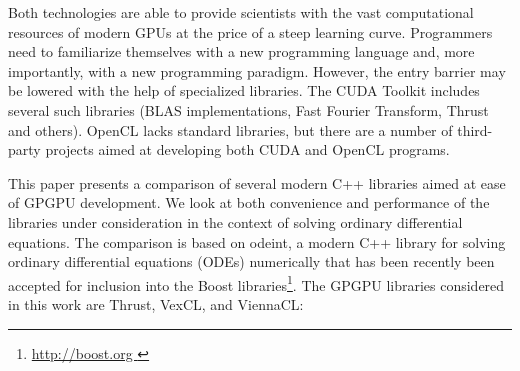 \documentclass[final]{siamltex}
\begin{document}
Both technologies are able to provide scientists with the vast computational
resources of modern GPUs at the price of a steep learning curve.
Programmers need to familiarize
themselves with a new programming language and, more importantly, with a
new programming paradigm. However, the entry barrier may be lowered with the help of
specialized libraries. The CUDA Toolkit includes several such libraries (BLAS
implementations, Fast Fourier Transform, Thrust and others). OpenCL lacks
standard libraries, but there are a number of third-party projects aimed at
developing both CUDA and OpenCL programs.

This paper presents a comparison of several modern C++ libraries aimed
at ease of GPGPU development. We look at both convenience and
performance of the libraries under consideration in the context of
solving ordinary differential equations.  The comparison is based on
odeint, a modern C++ library for solving ordinary differential equations (ODEs) numerically that has been recently
been accepted for inclusion into the Boost libraries\footnote{ \href{ http://boost.org }
  { http://boost.org } }.  The GPGPU libraries considered in this work
are Thrust, VexCL, and ViennaCL:
\end{document}
